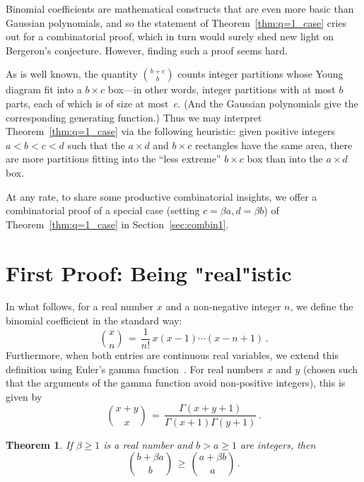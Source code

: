 \documentclass[11pt]{amsart}
\newtheorem{theorem}{Theorem} %
\begin{document}
Binomial coefficients are mathematical constructs that are even more basic than Gaussian polynomials, and so the statement of
Theorem~\ref{thm:q=1_case} cries out for a combinatorial proof, which in turn would surely shed new light on
Bergeron's conjecture. However, finding such a proof seems hard.

As is well known, the quantity $\binom{b+c}b$ counts integer partitions whose Young diagram fit into a $b
\times c$ box---in other words, integer partitions with at most $b$ parts, each of which is of size at most~$c$.
(And the Gaussian polynomials give the corresponding generating function.)
Thus we may interpret Theorem~\ref{thm:q=1_case} via the following heuristic: given positive integers
$a<b<c<d$ such that the $a \times d$ and $b \times c$ rectangles have the same area, there are more
partitions fitting into the ``less extreme'' $b \times c$ box than into the $a \times d$ box.

At any rate, to share some productive combinatorial insights, we offer a combinatorial proof of a special case 
(setting $c=\beta a, d=\beta b$) of Theorem~\ref{thm:q=1_case} in Section~\ref{sec:combin1}.


\section{First Proof: Being "real"istic}

In what follows, for a real number $x$ and a non-negative integer $n$, we define the binomial coefficient in the standard way:
$$
  \binom{x}{n} \, = \, \frac{1}{n!} \, x(x-1) \cdots (x-n+1) \, .
$$
Furthermore, when both entries are continuous real variables, we extend this definition using Euler's gamma function~\cite[p.~235]{BN}. For real numbers $x$ and $y$ (chosen such that the arguments of the gamma function avoid non-positive integers), this is given by
$$
  \binom{x+y}{x} \, = \, \frac{\Gamma(x+y+1)}{\Gamma(x+1)\Gamma(y+1)} \, .
$$ 



\begin{theorem} \label{real_case} If $\beta\geq1$ is a real number and $b>a\geq1$ are integers, then
$$\binom{b+\beta a}b \, \geq \, \binom{a+\beta b}a \, .$$
\end{theorem}
\end{document}
